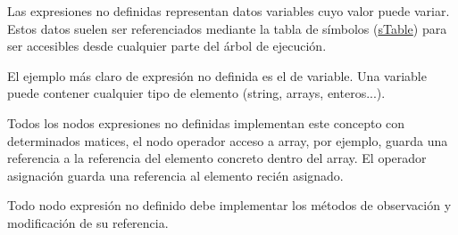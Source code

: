 Las expresiones no definidas representan datos variables cuyo valor puede variar. Estos datos suelen ser referenciados mediante la tabla de símbolos (\hyperlink{classsTable}{s\-Table}) para ser accesibles desde cualquier parte del árbol de ejecución.

El ejemplo más claro de expresión no definida es el de variable. Una variable puede contener cualquier tipo de elemento (string, arrays, enteros...).

Todos los nodos expresiones no definidas implementan este concepto con determinados matices, el nodo operador acceso a array, por ejemplo, guarda una referencia a la referencia del elemento concreto dentro del array. El operador asignación guarda una referencia al elemento recién asignado.

Todo nodo expresión no definido debe implementar los métodos de observación y modificación de su referencia. 

